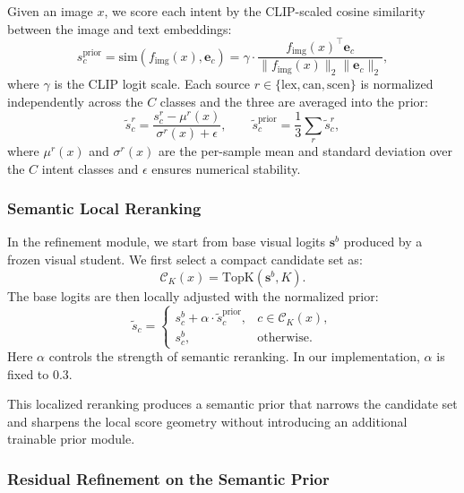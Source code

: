 Given an image $x$, we score each intent by the CLIP-scaled cosine similarity between the image and text embeddings:
\begin{equation}
s^{\text{prior}}_c = \text{sim}(f_{\text{img}}(x), \mathbf{e}_c) = \gamma \cdot \frac{f_{\text{img}}(x)^\top \mathbf{e}_c}{\|f_{\text{img}}(x)\|_2 \|\mathbf{e}_c\|_2},
\end{equation}
where $\gamma$ is the CLIP logit scale. Each source $r \in \{\text{lex}, \text{can}, \text{scen}\}$ is normalized independently across the $C$ classes and the three are averaged into the prior:
\begin{equation}
\tilde{s}^{r}_c = \frac{s^{r}_c - \mu^{r}(x)}{\sigma^{r}(x) + \epsilon},
\qquad
\tilde{s}^{\text{prior}}_c = \frac{1}{3}\sum_{r}\tilde{s}^{r}_c,
\end{equation}
where $\mu^{r}(x)$ and $\sigma^{r}(x)$ are the per-sample mean and standard deviation over the $C$ intent classes and $\epsilon$ ensures numerical stability.

\subsubsection{Semantic Local Reranking}

In the refinement module, we start from base visual logits $\mathbf{s}^{b}$ produced by a frozen visual student. We first select a compact candidate set as:
\begin{equation}
\mathcal{C}_K(x) = \text{TopK}(\mathbf{s}^{b}, K).
\end{equation}
The base logits are then locally adjusted with the normalized prior:
\begin{equation}
\tilde{s}_c =
\begin{cases}
s^{b}_c + \alpha \cdot \tilde{s}^{\text{prior}}_c, & c \in \mathcal{C}_K(x), \\
s^{b}_c, & \text{otherwise}.
\end{cases}
\end{equation}
Here $\alpha$ controls the strength of semantic reranking. In our implementation, $\alpha$ is fixed to 0.3.

This localized reranking produces a semantic prior that narrows the candidate set and sharpens the local score geometry without introducing an additional trainable prior module.

\subsubsection{Residual Refinement on the Semantic Prior}

